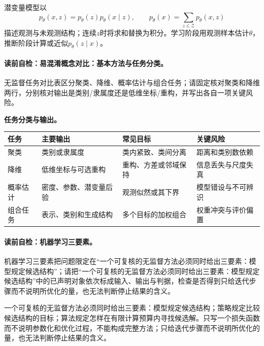 \begin{definition}[潜变量概率模型]\label{def:V4-C01-latent-model}
潜变量模型以
\[
p_\theta(x,z)=p_\theta(z)p_\theta(x\mid z),\qquad
p_\theta(x)=\sum_{z\in\mathcal Z}p_\theta(x,z)
\]
描述观测与未观测结构；连续$z$时将求和替换为积分。学习阶段用观测样本估计$\theta$，推断阶段计算或近似$p_\theta(z\mid x)$。
\end{definition}

\paragraph{读前自检：易混淆概念对比：基本方法与任务分类。}无监督任务对比表区分聚类、降维、概率估计与组合任务；请固定核对聚类和降维两行，分别核对输出是类别/隶属度还是低维坐标/重构，并写出各自一项关键风险。\par

\begin{comparisonbox}
\textbf{任务分类与输出。}\par\smallskip
\begin{tabularx}{\linewidth}{@{}l X X X@{}}
\toprule 任务 & 主要输出 & 常见目标 & 关键风险\\ \midrule
聚类 & 类别或隶属度 & 类内紧致、类间分离 & 距离和类别数依赖\\
降维 & 低维坐标与可选重构 & 重构、方差或邻域保持 & 信息丢失与尺度失真\\
概率估计 & 密度、参数、潜变量后验 & 观测似然或其下界 & 模型错设与不可辨识\\
组合任务 & 表示、类别和生成结构 & 多个目标的加权组合 & 权重冲突与评价偏置\\
\bottomrule
\end{tabularx}
\end{comparisonbox}

\paragraph{读前自检：机器学习三要素。}机器学习三要素把问题限定在“一个可复核的无监督方法必须同时给出三要素：模型规定候选结构”；请把“一个可复核的无监督方法必须同时给出三要素：模型规定候选结构”中的已声明对象依次标成输入、输出与判据，检查是否得到只给迭代步骤而不说明所优化的量，也无法判断停止结果的含义。\par

一个可复核的无监督方法必须同时给出三要素：模型规定候选结构；策略规定比较候选结构的目标；算法规定怎样在有限计算预算内寻找候选解。只写一个损失函数而不说明参数化和优化过程，不能构成完整方法；只给迭代步骤而不说明所优化的量，也无法判断停止结果的含义。

